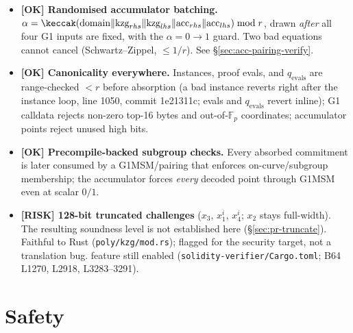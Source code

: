\begin{itemize}
  \item \textcolor{tracegreen}{\textbf{[OK] Randomised accumulator
        batching.}} $\alpha=\keccak(\text{domain}\|\text{kzg}_{rhs}\|
        \text{kzg}_{lhs}\|\text{acc}_{rhs}\|\text{acc}_{lhs})\bmod r$,
        drawn \emph{after} all four G1 inputs are fixed, with the
        $\alpha{=}0\!\to\!1$ guard. Two bad equations cannot cancel
        (Schwartz--Zippel, $\le 1/r$). See \S\ref{sec:acc-pairing-verify}.
  \item \textcolor{tracegreen}{\textbf{[OK] Canonicality everywhere.}}
        Instances, proof evals, and $q_\text{evals}$ are range-checked
        $<r$ before absorption (a bad instance reverts right after the
        instance loop, line 1050, commit 1e21311c; evals and
        $q_\text{evals}$ revert inline); G1 calldata rejects non-zero top-16 bytes
        and out-of-$\mathbb{F}_p$ coordinates; accumulator points reject
        unused high bits.
  \item \textcolor{tracegreen}{\textbf{[OK] Precompile-backed subgroup
        checks.}} Every absorbed commitment is later consumed by a
        G1MSM/pairing that enforces on-curve/subgroup membership; the
        accumulator forces \emph{every} decoded point through G1MSM even
        at scalar $0/1$.
  \item \textcolor{rustorange}{\textbf{[RISK] 128-bit truncated
        challenges}} ($x_3$, $x_1^i$, $x_4^i$; $x_2$ stays full-width).
        The resulting soundness level is not established here
        (\S\ref{sec:pr-truncate}). Faithful to Rust
        (\texttt{poly/kzg/mod.rs}); flagged for the security target, not a
        translation bug.  feature still enabled
        (\texttt{solidity-verifier/\allowbreak{}Cargo.toml}; B64 L1270, L2918,
        L3283--3291).
\end{itemize}

\section{Safety}
\label{sec:pr-safety}

